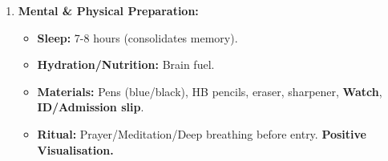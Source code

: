 \documentclass[11pt]{article}
\begin{document}
\begin{methode}
\begin{enumerate}
\begin{itemize}
        \item \textbf{Timed Plans:} 5 mins $\rightarrow$ Thesis + 4 Points + Quotes (Paper 1 \& 2 Essay).
        \item \textbf{Timed Introductions:} 10 mins $\rightarrow$ Perfect Hook + Context + Thesis.
        \item \textbf{Annotation Practice:} 10 mins $\rightarrow$ Unseen Poem/Prose $\rightarrow$ 10 Devices + Effects.
        \item \textbf{Grammar Blitz:} 20 mins $\rightarrow$ Modal transformations, Reported speech, Conditionals, Passive, Ellipsis.
        \item \textbf{Phonology Drill:} Transcribe 3 sentences $\rightarrow$ Weak forms, Linking, Stress, Tone units.
    \end{itemize}
    \item \textbf{Mental \& Physical Preparation:}
    \begin{itemize}
        \item \textbf{Sleep:} 7-8 hours (consolidates memory).
        \item \textbf{Hydration/Nutrition:} Brain fuel.
        \item \textbf{Materials:} Pens (blue/black), HB pencils, eraser, sharpener, \textbf{Watch}, \textbf{ID/Admission slip}.
        \item \textbf{Ritual:} Prayer/Meditation/Deep breathing before entry. \textbf{Positive Visualisation.}
    \end{itemize}
\end{enumerate}
\end{methode}
\end{document}
